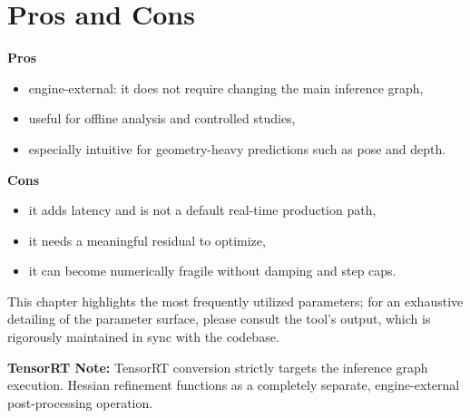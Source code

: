 \section{Pros and Cons}
\textbf{Pros}
\begin{itemize}
  \item engine-external: it does not require changing the main inference graph,
  \item useful for offline analysis and controlled studies,
  \item especially intuitive for geometry-heavy predictions such as pose and depth.
\end{itemize}

\textbf{Cons}
\begin{itemize}
  \item it adds latency and is not a default real-time production path,
  \item it needs a meaningful residual to optimize,
  \item it can become numerically fragile without damping and step caps.
\end{itemize}

This chapter highlights the most frequently utilized parameters; for an exhaustive detailing of the parameter surface, please consult the tool's  output, which is rigorously maintained in sync with the codebase.


\noindent\textbf{TensorRT Note:} TensorRT conversion strictly targets the inference graph execution. Hessian refinement functions as a completely separate, engine-external post-processing operation.
